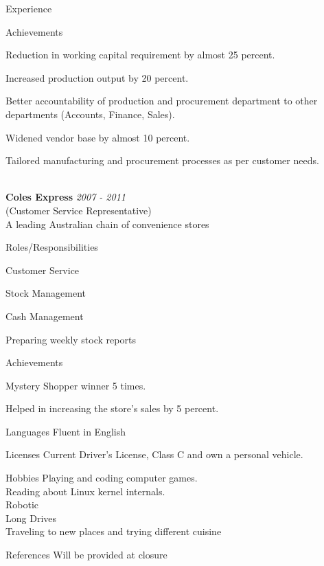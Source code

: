 \documentclass{resume}
\begin{document}
\begin{rSection}{Experience}
\begin{rSubsection}{Achievements}{}{}{}
\item Reduction in working capital requirement by almost 25 percent.
\item Increased production output by 20 percent.
\item Better accountability of production and procurement department to other departments (Accounts, Finance, Sales).
\item Widened vendor base by almost 10 percent.
\item Tailored manufacturing and procurement processes as per customer needs.\\\\
\end{rSubsection}

{\bf Coles Express} \hfill {\em  2007 - 2011} 
\\ (Customer Service Representative)
\\ A leading Australian chain of convenience stores

\begin{rSubsection}{Roles/Responsibilities}{}{}{}   
 \item Customer Service
 \item Stock Management
 \item Cash Management
 \item Preparing weekly stock reports
\end{rSubsection}

\begin{rSubsection}{Achievements}{}{}{}
 \item Mystery Shopper winner 5 times.
 \item Helped in increasing the store's sales by 5 percent.
\end{rSubsection}
\end{rSection}

\begin{rSection}{Languages}
 Fluent in English
\end{rSection}

\begin{rSection}{Licenses}
Current Driver’s License, Class C and own a personal vehicle.
\end{rSection}

\begin{rSection}{Hobbies}
Playing and coding computer games.\\
Reading about Linux kernel internals.\\
Robotic\\
Long Drives\\
Traveling to new places and trying different cuisine\\
\end{rSection}


\begin{rSection}{References}
Will be provided at closure
\end{rSection}
\end{document}
